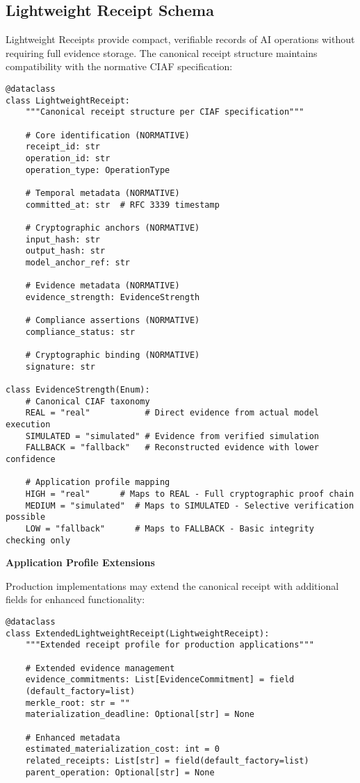 \documentclass[12pt,a4paper]{article}
\begin{document}
\subsection{Lightweight Receipt Schema}

Lightweight Receipts provide compact, verifiable records of AI operations without requiring full evidence storage. The canonical receipt structure maintains compatibility with the normative CIAF specification:

\begin{lstlisting}[caption=Canonical Lightweight Receipt Structure (Normative)]
@dataclass
class LightweightReceipt:
    """Canonical receipt structure per CIAF specification"""
    
    # Core identification (NORMATIVE)
    receipt_id: str
    operation_id: str
    operation_type: OperationType
    
    # Temporal metadata (NORMATIVE)
    committed_at: str  # RFC 3339 timestamp
    
    # Cryptographic anchors (NORMATIVE)
    input_hash: str
    output_hash: str
    model_anchor_ref: str
    
    # Evidence metadata (NORMATIVE)
    evidence_strength: EvidenceStrength
    
    # Compliance assertions (NORMATIVE)
    compliance_status: str
    
    # Cryptographic binding (NORMATIVE)
    signature: str
    
class EvidenceStrength(Enum):
    # Canonical CIAF taxonomy
    REAL = "real"           # Direct evidence from actual model execution
    SIMULATED = "simulated" # Evidence from verified simulation
    FALLBACK = "fallback"   # Reconstructed evidence with lower confidence
    
    # Application profile mapping
    HIGH = "real"      # Maps to REAL - Full cryptographic proof chain
    MEDIUM = "simulated"  # Maps to SIMULATED - Selective verification possible  
    LOW = "fallback"      # Maps to FALLBACK - Basic integrity checking only
\end{lstlisting}

\begin{technicalbox}
\textbf{Application Profile Extensions}

Production implementations may extend the canonical receipt with additional fields for enhanced functionality:

\begin{lstlisting}[caption=Extended Receipt Profile (Application Layer)]
@dataclass
class ExtendedLightweightReceipt(LightweightReceipt):
    """Extended receipt profile for production applications"""
    
    # Extended evidence management
    evidence_commitments: List[EvidenceCommitment] = field
    (default_factory=list)
    merkle_root: str = ""
    materialization_deadline: Optional[str] = None
    
    # Enhanced metadata
    estimated_materialization_cost: int = 0
    related_receipts: List[str] = field(default_factory=list)
    parent_operation: Optional[str] = None
\end{lstlisting}
\end{technicalbox}
\end{document}
